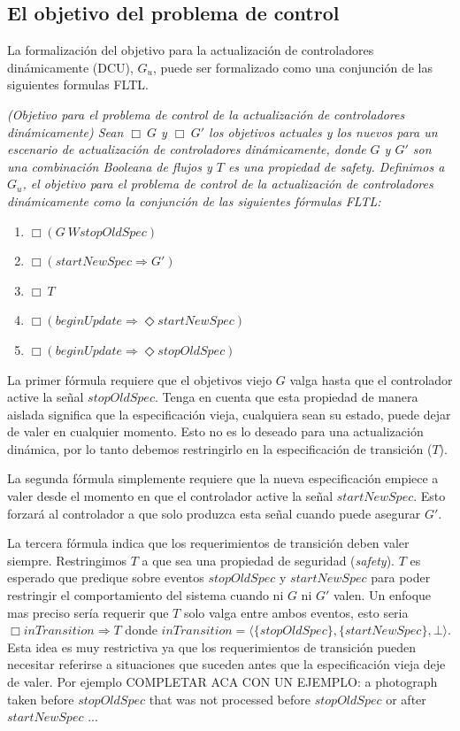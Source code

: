 \subsection{El objetivo del problema de control}

La formalización del objetivo para la actualización de controladores dinámicamente (DCU), $G_u$, puede ser formalizado
como una conjunción de las siguientes formulas FLTL.

\begin{nahaDef}
\label{update_goals_def}
\emph{(Objetivo para el problema de control de la actualización de controladores dinámicamente) Sean $\Box\ G$ y $\Box\ G'$
los objetivos actuales y los nuevos para un escenario de actualización de controladores dinámicamente, donde $G$ y $G'$
son una combinación Booleana de flujos y $T$ es una propiedad de safety. Definimos a $G_u$, el objetivo para el
problema de control de la actualización de controladores dinámicamente como la conjunción de las siguientes fórmulas
FLTL:}
\end{nahaDef}

\begin{enumerate}
\itemsep-4mm
\item $\Box(G\ W stopOldSpec)$
\item $\Box(startNewSpec \Longrightarrow G')$
\item $\Box\ T$
\item $\Box(beginUpdate \Longrightarrow \Diamond startNewSpec)$
\item $\Box(beginUpdate \Longrightarrow \Diamond stopOldSpec)$
\end{enumerate}

La primer fórmula requiere que el objetivos viejo $G$ valga hasta que el controlador active la señal $stopOldSpec$.
Tenga en cuenta que esta propiedad de manera aislada significa que la especificación vieja, cualquiera sean su estado,
puede dejar de valer en cualquier momento. Esto no es lo deseado para una actualización dinámica, por lo tanto debemos
restringirlo en la especificación de transición ($T$).

La segunda fórmula simplemente requiere que la nueva especificación empiece a valer desde el momento en que el
controlador active la señal $startNewSpec$. Esto forzará al controlador a que solo produzca esta señal cuando puede
asegurar $G'$.

La tercera fórmula indica que los requerimientos de transición deben valer siempre. Restringimos $T$ a que sea una
propiedad de seguridad (\emph{safety}). $T$ es esperado que predique sobre eventos $stopOldSpec$ y $startNewSpec$ para
poder restringir el comportamiento del sistema cuando ni $G$ ni $G'$ valen. Un enfoque mas preciso sería requerir que
$T$ solo valga entre ambos eventos, esto seria $\Box inTransition \Longrightarrow T$ donde $inTransition =
\langle\{stopOldSpec\},\{startNewSpec\}, \bot\rangle$. Esta idea es muy restrictiva ya que los requerimientos de transición
pueden necesitar referirse a situaciones que suceden antes que la especificación vieja deje de valer. Por ejemplo
COMPLETAR ACA CON UN EJEMPLO: a photograph taken before $stopOldSpec$ that was not processed before $stopOldSpec$ or
after $startNewSpec$ ...

